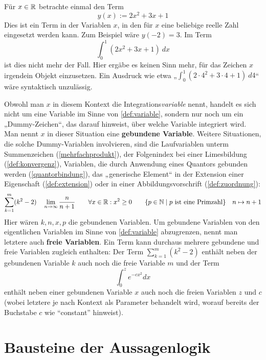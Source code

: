 \begin{nota} \label{gebundenevariable}  
    Für $x\in\mathbb R$ betrachte einmal den Term
        \[ y(x):=2x^2+3x+1 \]
    Dies ist ein Term in der Variablen $x$, in den für $x$ eine beliebige reelle Zahl eingesetzt werden kann. Zum Beispiel wäre $y(-2)=3$. Im Term
        \[ \int_0^1 (2x^2+3x+1)\ dx\]
    ist dies nicht mehr der Fall. Hier ergäbe es keinen Sinn mehr, für das Zeichen $x$ irgendein Objekt einzusetzen. Ein Ausdruck wie etwa „$\int_0^1 (2\cdot 4^2+3\cdot 4+1)\ d4$“ wäre syntaktisch unzulässig.

    Obwohl man $x$ in diesem Kontext die Integrations\emph{variable} nennt, handelt es sich nicht um eine Variable im Sinne von \cref{def:variable}, sondern nur noch um ein „Dummy-Zeichen“, das darauf hinweist, über welche Variable integriert wird. Man nennt $x$ in dieser Situation eine \textbf{gebundene Variable}. Weitere Situationen, die solche Dummy-Variablen involvieren, sind die Laufvariablen unterm Summenzeichen (\cref{mehrfachprodukt}), der Folgenindex bei einer Limesbildung (\cref{def:konvergenz}), Variablen, die durch Anwendung eines Quantors gebunden werden (\cref{quantorbindung}), das „generische Element“ in der Extension einer Eigenschaft (\cref{def:extension}) oder in einer Abbildungsvorschrift (\cref{def:zuordnung}):
        \[ \sum_{k=1}^m (k^2-2) \quad \lim_{n\to \infty} \frac{n}{n+1} \qquad \forall x\in\R: x^2\ge 0 \qquad \{p\in \N \mid p\ \text{ist eine Primzahl}\} \quad n\mapsto n+1 \]
    Hier wären $k,n,x,p$ die gebundenen Variablen. Um gebundene Variablen von den eigentlichen Variablen im Sinne von \cref{def:variable} abzugrenzen, nennt man letztere auch \textbf{freie Variablen}. Ein Term kann durchaus mehrere gebundene und freie Variablen zugleich enthalten: Der Term $\sum_{k=1}^m(k^2-2)$ enthält neben der gebundenen Variable $k$ auch noch die freie Variable $m$ und der Term
        \[ \int_0^z e^{-cx^2} dx \]
    enthält neben einer gebundenen Variable $x$ auch noch die freien Variablen $z$ und $c$ (wobei letztere je nach Kontext als Parameter behandelt wird, worauf bereits der Buchstabe $c$ wie ``constant'' hinweist).
\end{nota}





\section{Bausteine der Aussagenlogik} \label{abschnitt:aussagenlogik}


